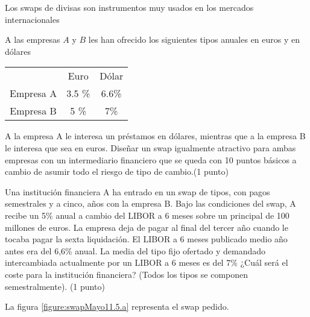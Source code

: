 \begin{problem}[5]
Los swaps de divisas son instrumentos muy usados en los mercados internacionales

\ppart A las empresas $A$ y $B$ les han ofrecido los siguientes tipos anuales en euros y en dólares

\begin{center}
\begin{tabular}{ccc}
\hline
& Euro & Dólar \\
Empresa A & 3.5 \% & 6.6\% \\
Empresa B & 5 \% & 7\% \\
\hline
\end{tabular}
\end{center}

A la empresa A le interesa un préstamos en dólares, mientras que a la empresa B le interesa que
sea en euros. Diseñar un swap igualmente atractivo para ambas empresas con un intermediario
financiero que se queda con 10 puntos básicos a cambio de asumir todo el riesgo de tipo de
cambio.(1 punto)

\ppart Una institución financiera A ha entrado en un swap de tipos, con pagos semestrales y a cinco,
años con la empresa B. Bajo las condiciones del swap, A recibe un 5\% anual a cambio del
LIBOR a 6 meses sobre un principal de 100 millones de euros. La empresa deja de pagar
al final del tercer año cuando le tocaba pagar la sexta liquidación. El LIBOR a 6 meses
publicado medio año antes era del 6,6\% anual. La media del tipo fijo ofertado y demandado
intercambiada actualmente por un LIBOR a 6 meses es del 7\% ¿Cuál será el coste para la
institución financiera? (Todos los tipos se componen semestralmente). (1 punto)

\solution

\spart

La figura \ref{figure:swapMayo11.5.a} representa el swap pedido.

\begin{figure}[hbpt]
\centering
{}
\end{figure}
\end{problem}
